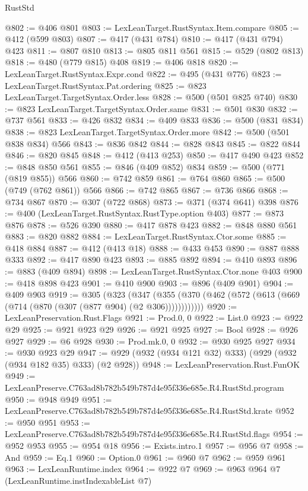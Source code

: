 \begin{lexlean}{RustStd}
\begin{coremodule}
@802 := @406 @801
@803 := LexLeanTarget.RustSyntax.Item.compare
@805 := @412 (@599 @803)
@807 := @417 (@431 @784)
@810 := @417 (@431 @794) @423
@811 := @807 @810
@813 := @805 @811 @561
@815 := @529 (@802 @813)
@818 := @480 (@779 @815) @408
@819 := @406 @818
@820 := LexLeanTarget.RustSyntax.Expr.cond
@822 := @495 (@431 @776)
@823 := LexLeanTarget.RustSyntax.Pat.ordering
@825 := @823 LexLeanTarget.TargetSyntax.Order.less
@828 := @500 (@501 @825 @740)
@830 := @823 LexLeanTarget.TargetSyntax.Order.same
@831 := @501 @830
@832 := @737 @561
@833 := @426 @832
@834 := @409 @833
@836 := @500 (@831 @834)
@838 := @823 LexLeanTarget.TargetSyntax.Order.more
@842 := @500 (@501 @838 @834) @566
@843 := @836 @842
@844 := @828 @843
@845 := @822 @844
@846 := @820 @845
@848 := @412 (@413 @253)
@850 := @417 @490 @423
@852 := @848 @850 @561
@855 := @846 (@409 @852) @834
@859 := @500 (@771 (@819 @855)) @566
@860 := @742 @859
@861 := @764 @860
@865 := @500 (@749 (@762 @861)) @566
@866 := @742 @865
@867 := @736 @866
@868 := @734 @867
@870 := @307 (@722 @868)
@873 := @371 (@374 @641) @398
@876 := @400 (LexLeanTarget.RustSyntax.RustType.option @403)
@877 := @873 @876
@878 := @526 @390
@880 := @417 @878 @423
@882 := @848 @880 @561
@883 := @820 @882
@884 := LexLeanTarget.RustSyntax.Ctor.some
@885 := @418 @884
@887 := @412 (@413 @18)
@888 := @433 @453
@890 := @887 @888 @333
@892 := @417 @890 @423
@893 := @885 @892
@894 := @410 @893
@896 := @883 (@409 @894)
@898 := LexLeanTarget.RustSyntax.Ctor.none @403
@900 := @418 @898 @423
@901 := @410 @900
@903 := @896 (@409 @901)
@904 := @409 @903
@919 := @305
    (@323
      (@347 (@355 (@370 (@462 (@572 (@613 (@669 (@714 (@870 (@307 (@877 @904) (@2 @306))))))))))))
@920 := LexLeanPreservation.Rust.Flags
@921 := Prod.{0, 0}
@922 := List.{0}
@923 := @922 @29
@925 := @921 @923 @29
@926 := @921 @925
@927 := Bool
@928 := @926 @927
@929 := @6 @928
@930 := Prod.mk.{0, 0}
@932 := @930 @925 @927
@934 := @930 @923 @29
@947 := @929 (@932 (@934 @121 @32) @333) (@929 (@932 (@934 @182 @35) @333) (@2 @928))
@948 := LexLeanPreservation.Rust.FunOK
@949 := LexLeanPreserve.C763ad8b782b549b787d4e95f336e685e.R4.RustStd.program
@950 := @948 @949
@951 := LexLeanPreserve.C763ad8b782b549b787d4e95f336e685e.R4.RustStd.krate
@952 := @950 @951
@953 := LexLeanPreserve.C763ad8b782b549b787d4e95f336e685e.R4.RustStd.flags
@954 := @952 @953
@955 := @954 @18
@956 := Exists.intro.{1}
@957 := @956 @7
@958 := And
@959 := Eq.{1}
@960 := Option.{0}
@961 := @960 @7
@962 := @959 @961
@963 := LexLeanRuntime.index
@964 := @922 @7
@969 := @963 @964 @7 (LexLeanRuntime.instIndexableList @7)

\end{coremodule}
\end{lexlean}

